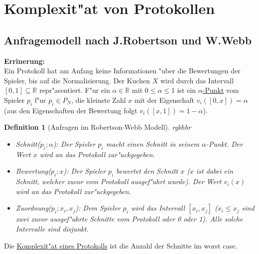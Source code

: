 \documentclass[11pt, a4paper, twoside]{article}
\newcommand{\wf}{\color{white}}
\newcommand{\tf}{\color{black}}
\newtheorem{defi}[satz]{Definition}
\numberwithin{equation}{section}
\begin{document}
\section{Komplexit"at von Protokollen}
\subsection{Anfragemodell nach J.Robertson und W.Webb}
\textbf{Errinerung:}\\
Ein Protokoll hat am Anfang keine Informationen "uber die Bewertungen der Spieler, bis auf die Normalisierung. Der Kuchen $X$ wird durch das Intervall $[0,1]\subseteq \mathbb{R}$ repr"asentiert. F"ur ein $\alpha \in \mathbb{R}$ mit $0 \leq \alpha \leq 1$ ist ein \underline{$\alpha$-Punkt} vom Spieler $p_i$ f"ur $p_i \in P_N$, die kleinste Zahl $x$ mit der Eigenschaft $v_i([0,x])=\alpha$ (aus den Eigenschaften der Bewertung folgt $v_i([x,1])=1-\alpha$).
\begin{defi}[Anfragen im Robertson-Webb Modell] \wf rgkhbr \tf \\
\begin{itemize}
\item Schnitt($p_i;\alpha$): Der Spieler $p_i$ macht einen Schnitt in seinem $\alpha$-Punkt. Der Wert $x$ wird an das Protokoll zur"uckgegeben.\\
\item Bewertung($p_i;x$): Der Spieler $p_i$ bewertet den Schnitt $x$ ($x$ ist dabei ein Schnitt, welcher zuvor vom Protokoll ausgef"uhrt wurde). Der Wert $v_i(x)$ wird an das Protokoll zur"uckgegeben.\\
\item Zuordnung($p_i;x_i,x_j$): Dem Spieler $p_i$ wird das Intervall $[x_i,x_j]$ ($x_i \leq x_j$ sind zwei zuvor ausgef"uhrte Schnitte vom Protokoll oder 0 oder 1). Alle solche Intervalle sind disjunkt.
\end{itemize}  
\end{defi}
Die \underline{Komplexit"at eines Protokolls} ist die Anzahl der Schnitte im worst case.
\end{document}

